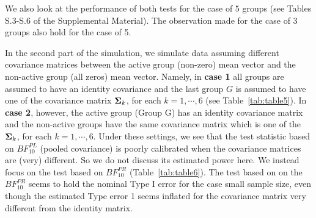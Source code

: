 \documentclass[times,sort&compress,3p]{elsarticle}
\theoremstyle{plain}%
\theoremstyle{definition}
\newcommand{\uSigma}            {\mbox{\boldmath$\Sigma$}}
\begin{document}
We also look at the performance of both tests for the case of $5$ groups (see Tables S.3-S.6 of the Supplemental Material). The observation made for the case of 3 groups also hold for the case of 5.

In the second part of the simulation, we simulate data assuming different covariance matrices between the active group (non-zero) mean vector and the non-active group (all zeros) mean vector. Namely, in {\bf case 1} all groups are assumed to have an identity covariance and the last group $G$ is assumed to have one of the  covariance matrix $\uSigma_k$, for each $k = 1, \cdots, 6$ (see Table~\ref{tab:table5}). 
In {\bf case 2}, however, the active group (Group G) has an identity  covariance matrix and the  non-active groups have the same covariance matrix which is one of the $\uSigma_k$, for each $k = 1, \cdots, 6$. Under these settings, we see that the test statistic based on $BF^{PL}_{10}$ (pooled covariance) is poorly calibrated when the covariance matrices are (very) different. So we do not discuss its estimated power here. We instead focus on the test based on $BF^{PR}_{10}$ (Table~\ref{tab:table6}). The test based on on the $BF^{PR}_{10}$ seems to hold the nominal Type I error for the case small sample size, even though the estimated Type error 1 seems inflated for the covariance matrix very different from the identity matrix.
\end{document}
